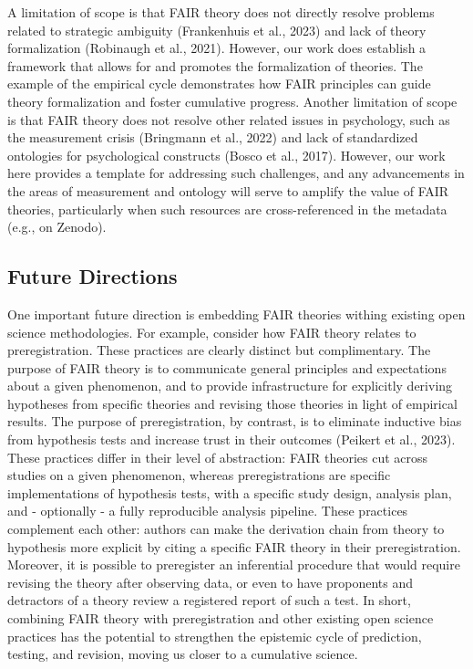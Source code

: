 \documentclass[
  man, noextraspace,floatsintext]{apa7}
\begin{document}
A limitation of scope is that FAIR theory does not directly resolve problems related to strategic ambiguity (Frankenhuis et al., 2023) and lack of theory formalization (Robinaugh et al., 2021).
However, our work does establish a framework that allows for and promotes the formalization of theories.
The example of the empirical cycle demonstrates how FAIR principles can guide theory formalization and foster cumulative progress.
Another limitation of scope is that FAIR theory does not resolve other related issues in psychology, such as the measurement crisis (Bringmann et al., 2022) and lack of standardized ontologies for psychological constructs (Bosco et al., 2017).
However, our work here provides a template for addressing such challenges,
and any advancements in the areas of measurement and ontology will serve to amplify the value of FAIR theories, particularly when such resources are cross-referenced in the metadata (e.g., on Zenodo).

\subsection{Future Directions}\label{future-directions}

\label{fairtheoryprereg}{One important future direction is embedding FAIR theories withing existing open science methodologies.
For example, consider how FAIR theory relates to preregistration.
These practices are clearly distinct but complimentary.
The purpose of FAIR theory is to communicate general principles and expectations about a given phenomenon,
and to provide infrastructure for explicitly deriving hypotheses from specific theories and revising those theories in light of empirical results.
The purpose of preregistration, by contrast, is to eliminate inductive bias from hypothesis tests and increase trust in their outcomes (Peikert et al., 2023).
These practices differ in their level of abstraction:
FAIR theories cut across studies on a given phenomenon,
whereas preregistrations are specific implementations of hypothesis tests,
with a specific study design, analysis plan, and - optionally - a fully reproducible analysis pipeline.
These practices complement each other:
authors can make the derivation chain from theory to hypothesis more explicit by citing a specific FAIR theory in their preregistration.
Moreover, it is possible to preregister an inferential procedure that would require revising the theory after observing data,
or even to have proponents and detractors of a theory review a registered report of such a test.
In short, combining FAIR theory with preregistration and other existing open science practices has the potential to strengthen the epistemic cycle of prediction, testing, and revision, moving us closer to a cumulative science.}
\end{document}
